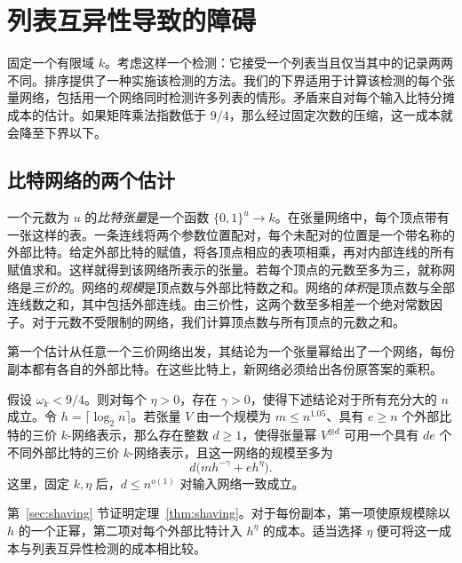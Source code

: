 \section{列表互异性导致的障碍}\label{sec:obstruction}

固定一个有限域 \(k\)。考虑这样一个检测：它接受一个列表当且仅当其中的记录两两不同。排序提供了一种实施该检测的方法。我们的下界适用于计算该检测的每个张量网络，包括用一个网络同时检测许多列表的情形。矛盾来自对每个输入比特分摊成本的估计。如果矩阵乘法指数低于 \(9/4\)，那么经过固定次数的压缩，这一成本就会降至下界以下。

\subsection{比特网络的两个估计}

一个元数为 \(u\) 的\emph{比特张量}是一个函数 \(\{0,1\}^u\to k\)。在张量网络中，每个顶点带有一张这样的表。一条连线将两个参数位置配对，每个未配对的位置是一个带名称的外部比特。给定外部比特的赋值，将各顶点相应的表项相乘，再对内部连线的所有赋值求和。这样就得到该网络所表示的张量。若每个顶点的元数至多为三，就称网络是\emph{三价的}。网络的\emph{规模}是顶点数与外部比特数之和。网络的\emph{体积}是顶点数与全部连线数之和，其中包括外部连线。由三价性，这两个数至多相差一个绝对常数因子。对于元数不受限制的网络，我们计算顶点数与所有顶点的元数之和。

第一个估计从任意一个三价网络出发，其结论为一个张量幂给出了一个网络，每份副本都有各自的外部比特。在这些比特上，新网络必须给出各份原答案的乘积。

\begin{theorem}[张量幂的压缩]\label{thm:shaving}
假设 \(\omega_k<9/4\)。则对每个 \(\eta>0\)，存在 \(\gamma>0\)，使得下述结论对于所有充分大的 \(n\) 成立。令 \(h=\lceil\log_2 n\rceil\)。若张量 \(V\) 由一个规模为 \(m\le n^{1.05}\)、具有 \(e\ge n\) 个外部比特的三价 \(k\)-网络表示，那么存在整数 \(d\ge1\)，使得张量幂 \(V^{\otimes d}\) 可用一个具有 \(de\) 个不同外部比特的三价 \(k\)-网络表示，且这一网络的规模至多为
\begin{equation}\label{eq:shave}
                   d\big(mh^{-\gamma}+eh^\eta\big).
\end{equation}
这里，固定 \(k,\eta\) 后，\(d\le n^{o(1)}\) 对输入网络一致成立。
\end{theorem}

第~\ref{sec:shaving} 节证明定理~\ref{thm:shaving}。对于每份副本，第一项使原规模除以 \(h\) 的一个正幂，第二项对每个外部比特计入 \(h^\eta\) 的成本。适当选择 \(\eta\) 便可将这一成本与列表互异性检测的成本相比较。

